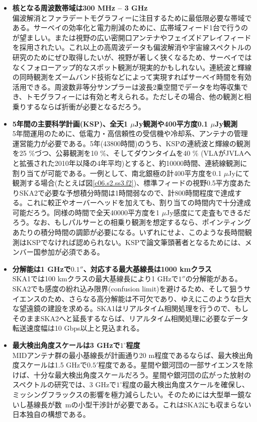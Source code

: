 \begin{itemize}
\item {\bf 核となる周波数帯域は300 MHz -- 3 GHz}\\
偏波解消とファラデートモグラフィーに注目するために最低限必要な帯域である。サーベイの効率化と電力削減のために、広帯域フィード1台で行うのが望ましい。または視野の広い密開口アンテナやフェイズドアレイフィードを採用されたい。これ以上の高周波データも偏波解消や宇宙線スペクトルの研究のためにぜひ取得したいが、視野が著しく狭くなるため、サーベイではなくフォローアップ的なスポット観測が現実的かもしれない。連続波と輝線の同時観測をズームバンド技術などによって実現すればサーベイ時間を有効活用できる。周波数非等分サンプラーは波長2乗空間でデータを均等収集でき、トモグラフィーには有効と考えられる。ただしその場合、他の観測と相乗りするならば折衝が必要となるだろう。
\item {\bf 5年間の主要科学計画(KSP)、全天1 $\mu$Jy観測や400平方度0.1 $\mu$Jy観測}\\
5年間運用のために、低電力・高信頼性の受信機や冷却系、アンテナの管理運営能力が必要である。5年(43800時間)のうち、KSPの連続波と輝線の観測を25 \%づつ、公募観測を10 \%、そしてダウンタイムを40 \% (VLAがJVLAへと拡張された2010年以降の4年平均)とすると、約10000時間、連続線観測に割り当てが可能である。一例として、南北銀極の計400平方度を0.1 $\mu$Jyにて観測する場合(たとえば図\ref{c06.s2.ss3.f2})、標準フィードの視野0.5平方度あたりSKA2で必要な予想積分時間は1時間弱なので、計800時間程度で達成する。これに較正やオーバーヘッドを加えても、割り当ての時間内で十分達成可能だろう。同様の時間で全天40000平方度を1 $\mu$Jy感度にて走査もできるだろう。なお、もしパルサーとの相乗り観測を想定するなら、ポインティングあたりの積分時間の調節が必要になる。いずれにせよ、このような長時間観測はKSPでなければ認められない。KSPで論文筆頭著者となるためには、メンバー国参加が必須である。
\item {\bf 分解能は1 GHzで$0.1''$、対応する最大基線長は1000 kmクラス}\\
SKA1では100 kmクラスの最大基線長により1 GHzで$1''$の分解能がある。SKA2でも感度の紛れ込み限界(confusion limit)を避けるため、そして狙うサイエンスのため、さらなる高分解能は不可欠であり、ゆえにこのような巨大な望遠鏡の建設を求める。SKA1はリアルタイム相関処理を行うので、もしそのままSKA2へと延長するならば、リアルタイム相関処理に必要なデータ転送速度幅は10 Gbps以上と見込まれる。
\item {\bf 最大検出角度スケールは3 GHzで$1^\circ$程度}\\
MIDアンテナ群の最小基線長が計画通り20 m程度であるならば、最大検出角度スケールは1.5 GHzで$0.5'$程度である。星間や銀河団の一部サイエンスを除けば、十分な最大検出角度スケールだろう。星間や銀河団の広がった放射のスペクトルの研究では、3 GHzで$1^\circ$程度の最大検出角度スケールを確保し、ミッシングフラックスの影響を極力減らしたい。そのためには大型単一鏡ないし基線長が数~mの小型干渉計が必要である。これはSKA2にも収まらない日本独自の構想である。

\end{itemize}
